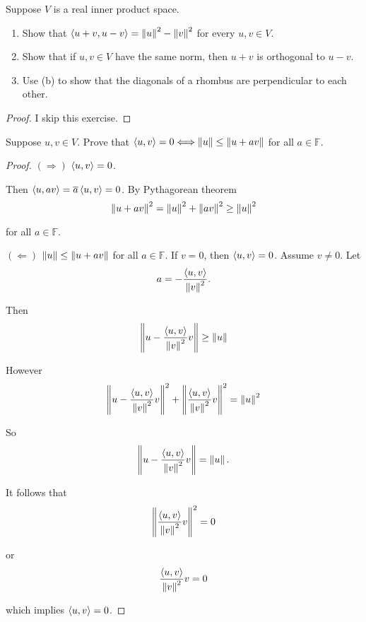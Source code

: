 \begin{exercise}
    Suppose $V$ is a real inner product space.
    \begin{enumerate}[label={(\alph*)}]
        \item Show that $\left\langle{u + v, u - v}\right\rangle = \left\Vert{u}\right\Vert^{2} - \left\Vert{v}\right\Vert^{2}$ for every $u, v\in V$.
        \item Show that if $u, v\in V$ have the same norm, then $u + v$ is orthogonal to $u - v$.
        \item Use (b) to show that the diagonals of a rhombus are perpendicular to each other.
    \end{enumerate}
\end{exercise}

\begin{proof}
    I skip this exercise.
\end{proof}
\newpage

\begin{exercise}
    Suppose $u, v \in V$. Prove that $\left\langle{u, v}\right\rangle = 0 \Longleftrightarrow \left\Vert{u}\right\Vert\leq \left\Vert{u + av}\right\Vert$ for all $a\in\mathbb{F}$.
\end{exercise}

\begin{proof}
    $(\Rightarrow)$ $\left\langle{u, v}\right\rangle = 0$.

    Then $\left\langle{u, av}\right\rangle = \overline{a}\left\langle{u, v}\right\rangle = 0$. By Pythagorean theorem
    \[
        \left\Vert{u + av}\right\Vert^{2} = \left\Vert{u}\right\Vert^{2} + \left\Vert{av}\right\Vert^{2} \geq \left\Vert{u}\right\Vert^{2}
    \]

    for all $a\in\mathbb{F}$.

    $(\Leftarrow)$ $\left\Vert{u}\right\Vert\leq \left\Vert{u + av}\right\Vert$ for all $a\in\mathbb{F}$. If $v = 0$, then $\left\langle{u, v}\right\rangle = 0$. Assume $v\ne 0$. Let
    \[
        a = -\frac{\left\langle{u, v}\right\rangle}{\left\Vert{v}\right\Vert^{2}}.
    \]

    Then
    \[
        \left\Vert{u - \frac{\left\langle{u, v}\right\rangle}{\left\Vert{v}\right\Vert^{2}}v}\right\Vert\geq \left\Vert{u}\right\Vert
    \]

    However
    \[
        \left\Vert{u - \frac{\left\langle{u, v}\right\rangle}{\left\Vert{v}\right\Vert^{2}}v}\right\Vert^{2} + \left\Vert{\frac{\left\langle{u, v}\right\rangle}{\left\Vert{v}\right\Vert^{2}}v}\right\Vert^{2} = \left\Vert{u}\right\Vert^{2}
    \]

    So
    \[
        \left\Vert{u - \frac{\left\langle{u, v}\right\rangle}{\left\Vert{v}\right\Vert^{2}}v}\right\Vert = \left\Vert{u}\right\Vert.
    \]

    It follows that
    \[
        \left\Vert{\frac{\left\langle{u, v}\right\rangle}{\left\Vert{v}\right\Vert^{2}}v}\right\Vert^{2} = 0
    \]

    or
    \[
        \frac{\left\langle{u, v}\right\rangle}{\left\Vert{v}\right\Vert^{2}}v = 0
    \]

    which implies $\left\langle{u, v}\right\rangle = 0$.
\end{proof}
\newpage

